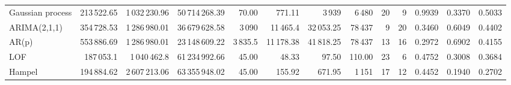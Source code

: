 \documentclass[a4paper,12pt]{report}
\begin{document}
\begin{table}[H]
\begin{tabular}{lrrrrrrrrrrrr}
Gaussian process & 213\,522.65 & 1\,032\,230.96 & 50\,714\,268.39 & 70.00 & 771.11 & 3\,939 & 6\,480 & 20 & 9 & 0.9939 & 0.3370 & 0.5033 \\
ARIMA(2,1,1) & 354\,728.53 & 1\,286\,980.01 & 36\,679\,628.58 & 3\,090 & 11\,465.4 & 32\,053.25 & 78\,437 & 9 & 20 & 0.3460 & 0.6049 & 0.4402 \\
AR(p) & 553\,886.69 & 1\,286\,980.01 & 23\,148\,609.22 & 3\,835.5 & 11\,178.38 & 41\,818.25 & 78\,437 & 13 & 16 & 0.2972 & 0.6902 & 0.4155 \\
LOF & 187\,053.1 & 1\,040\,462.8 & 61\,234\,992.66 & 45.00 & 48.33 & 97.50 & 110.00 & 23 & 6 & 0.4752 & 0.3008 & 0.3684 \\
Hampel & 194\,884.62 & 2\,607\,213.06 & 63\,355\,948.02 & 45.00 & 155.92 & 671.95 & 1\,151 & 17 & 12 & 0.4452 & 0.1940 & 0.2702 \\
\bottomrule
\end{tabular}
\end{table}
\end{document}

